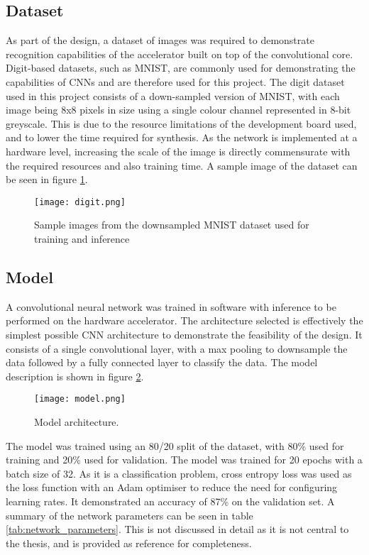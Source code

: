 \subsection{Dataset}
As part of the design, a dataset of images was required to demonstrate recognition capabilities of the accelerator built on top of the convolutional core.
Digit-based datasets, such as MNIST, are commonly used for demonstrating the capabilities of CNNs and are therefore used for this project.
The digit dataset used in this project consists of a down-sampled version of MNIST, with each image being 8x8 pixels in size using a single colour channel represented in 8-bit greyscale.
This is due to the resource limitations of the development board used, and to lower the time required for synthesis.
As the network is implemented at a hardware level, increasing the scale of the image is directly commensurate with the required resources and also training time.
A sample image of the dataset can be seen in figure \ref{fig:digit_dataset}.

\begin{figure}[h]
    \centering
    \texttt{[image: digit.png]}
    \caption{Sample images from the downsampled MNIST dataset used for training and inference}
    \label{fig:digit_dataset}
\end{figure}

\subsection{Model}
A convolutional neural network was trained in software with inference to be performed on the hardware accelerator.
The architecture selected is effectively the simplest possible CNN architecture to demonstrate the feasibility of the design.
It consists of a single convolutional layer, with a max pooling to downsample the data followed by a fully connected layer to classify the data.
The model description is shown in figure \ref{fig:model_architecture}.

\begin{figure}[h!]
    \centering
    \texttt{[image: model.png]}
    \caption[Model architecture]{Model architecture.}
    \label{fig:model_architecture}
\end{figure}

The model was trained using an 80/20 split of the dataset, with 80\% used for training and 20\% used for validation.
The model was trained for 20 epochs with a batch size of 32.
As it is a classification problem, cross entropy loss was used as the loss function with an Adam optimiser to reduce the need for configuring learning rates.
It demonstrated an accuracy of 87\% on the validation set.
A summary of the network parameters can be seen in table \ref{tab:network_parameters}.
This is not discussed in detail as it is not central to the thesis, and is provided as reference for completeness.

